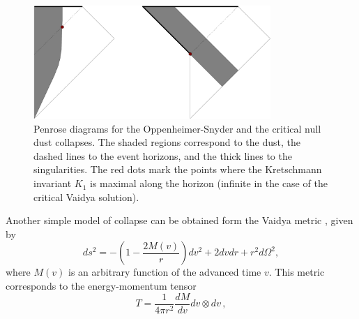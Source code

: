 \documentclass[floats,floatfix,showpacs,amssymb,prd,twocolumn,superscriptaddress,nofootinbib,nolongbibliography,reprint]{revtex4-2}
\begin{document}
\begin{figure}[!t]
    \centering
    \includegraphics[width=9cm]{Penrose.pdf}
    \caption{Penrose diagrams for the Oppenheimer-Snyder and the critical null dust collapses. The shaded regions correspond to the dust, the dashed lines to the event horizons, and the thick lines to the singularities. The red dots mark the points where the Kretschmann invariant $K_1$ is maximal along the horizon (infinite in the case of the critical Vaidya solution).}
    \label{fig:Penrose}
\end{figure}
Another simple model of collapse can be obtained form the Vaidya metric \cite{Vaidya:1951}, given by
\begin{equation}
ds^2 = -\left(1 - \frac{2M(v)}{r}\right) dv^2 + 2 dv dr + r^2 d \Omega^2,
\end{equation}
where $M(v)$ is an arbitrary function of the advanced time $v$. This metric corresponds to the energy-momentum tensor
\begin{equation}
T = \frac{1}{4\pi r^2} \frac{dM}{dv} dv\otimes dv \, ,
\end{equation}
\end{document}
